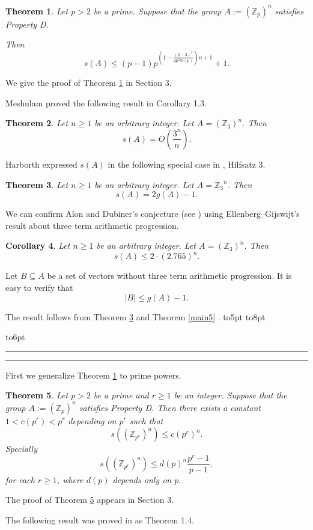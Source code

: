 \documentclass[12pt]{article}
\newtheorem{thm}{Theorem}[section]
\newtheorem{cor}[thm]{Corollary}
\newcommand{\proof
}{\par\medskip\noindent {\bf Proof.\ \ }}
\newcommand{\be}{\begin{equation}}
\newcommand{\ee}{\end{equation}}
\newcommand{\openbox}{\leavevmode
  \hbox to8pt{\hfil\vrule\vbox to6pt{\hrule width6pt\vfil\hrule}\vrule}}
\newcommand{\qed}{\hbox to5pt{ } \hfill \openbox\bigskip\medskip}
\newcommand{\Zp}{\mathbb Z _p}
\newcommand{\Z}{\mathbb Z}
\begin{document}
\begin{thm} \label{upper_EGZ}
Let $p>2$ be a prime. Suppose that the group $A:=({\Zp})^n$ satisfies Property D. 

Then 
$$
s(A)\leq (p-1)p^{(1-\frac{(p-2)^2}{2 p^2ln(p)})n+1}+1.
$$
\end{thm}

We give the proof of Theorem  \ref{upper_EGZ} in Section 3. 


Meshulam proved the following result in \cite{M} Corollary 1.3.

\begin{thm} \label{Mesh}
Let $n\geq 1$ be an arbitrary integer. Let $A=({{\Z}_3})^n$.  
Then
$$
s(A)=O(\frac{3^n}{n}).
$$
\end{thm}



Harborth expressed $s(A)$ in the following special case  in  \cite{H}, Hilfsatz 3.
\begin{thm} \label{Har3}
Let  $n\geq 1$ be an arbitrary integer. Let $A={{\Z}_3}^n$. Then
$$
s(A)=2g(A)-1.
$$
\end{thm}

We can confirm Alon and Dubiner's conjecture (see \cite{AD2}) using Ellenberg--Gijswijt's result about three term arithmetic progression.
\begin{cor} \label{maincor2}
Let  $n\geq 1$ be an arbitrary integer. Let $A=({{\Z}_3})^n$. 
Then 
$$
s(A)\leq  2\cdot (2.765)^{n}.
$$
\end{cor}
\proof 
Let $B\subseteq A$ be a set of vectors without three  term arithmetic progression.
It is easy to verify that 
$$
|B|\leq g(A)-1.
$$ 

The result follows from Theorem  \ref{Har3}  and  Theorem \ref{main5} . \qed

First we generalize Theorem \ref{upper_EGZ} to prime powers. 
\begin{thm} \label{ppower}
Let $p>2$ be a prime and $r\geq 1$ be an integer. Suppose that the group $A:=({\Z}_{p})^n$ satisfies Property D. Then there exists a constant $1<c(p^r)<p^r$ depending on $p^r$ such that
$$
s(({\Z}_{p^r})^n) \leq c(p^r)^n.
$$
Specially 
\be \label{EGZin}
s(({\Z}_{p^r})^n) \leq d(p)^n \frac{p^r-1}{p-1},
\ee 
for each $r\geq 1$, where $d(p)$ depends only on $p$. 
\end{thm}

The proof of Theorem \ref{ppower} appears in Section 3. 

The following result was proved in \cite{EEGKR} as Theorem 1.4.
\end{document}
